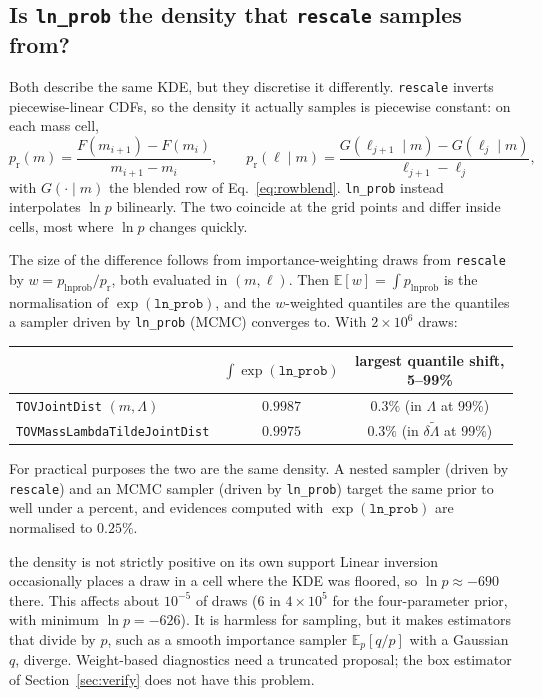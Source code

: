 \documentclass[11pt,a4paper]{article}
\newcommand{\dlt}{\delta\tilde{\Lambda}}
\newcommand{\code}[1]{\texttt{#1}}
\begin{document}
\subsection{Is \code{ln\_prob} the density that \code{rescale} samples from?}
\label{sec:discretisation}

Both describe the same KDE, but they discretise it differently.
\code{rescale} inverts piecewise-linear CDFs, so the density it actually
samples is piecewise constant: on each mass cell,
\begin{equation}
  p_{\mathrm{r}}(m) = \frac{F(m_{i+1}) - F(m_i)}{m_{i+1} - m_i},
  \qquad
  p_{\mathrm{r}}(\ell \mid m) = \frac{G(\ell_{j+1} \mid m) - G(\ell_j \mid m)}{\ell_{j+1} - \ell_j},
  \label{eq:rescale_density}
\end{equation}
with $G(\cdot \mid m)$ the blended row of Eq.~\eqref{eq:rowblend}.
\code{ln\_prob} instead interpolates $\ln p$ bilinearly. The two coincide at the
grid points and differ inside cells, most where $\ln p$ changes quickly.

The size of the difference follows from importance-weighting draws from
\code{rescale} by $w = p_{\mathrm{lnprob}} / p_{\mathrm{r}}$, both
evaluated in $(m, \ell)$. Then $\mathbb{E}[w] = \int p_{\mathrm{lnprob}}$ is the
normalisation of $\exp(\code{ln\_prob})$, and the $w$-weighted quantiles are
the quantiles a sampler driven by \code{ln\_prob} (MCMC) converges to. With
$2\times10^6$ draws:
\begin{center}
\begin{tabular}{lcc}
\toprule
& $\int \exp(\code{ln\_prob})$ & largest quantile shift, 5--99\% \\
\midrule
\code{TOVJointDist} $(m, \Lambda)$ & $0.9987$ & $0.3\%$ (in $\Lambda$ at 99\%) \\
\code{TOVMassLambdaTildeJointDist} & $0.9975$ & $0.3\%$ (in $\dlt$ at 99\%) \\
\bottomrule
\end{tabular}
\end{center}
For practical purposes the two are the same density. A nested sampler (driven
by \code{rescale}) and an MCMC sampler (driven by \code{ln\_prob}) target the
same prior to well under a percent, and evidences computed with
$\exp(\code{ln\_prob})$ are normalised to $0.25\%$.

\begin{caveat}{the density is not strictly positive on its own support}
Linear inversion occasionally places a draw in a cell where the KDE was
floored, so $\ln p \approx -690$ there. This affects about $10^{-5}$ of draws
(6 in $4\times10^5$ for the four-parameter prior, with minimum
$\ln p = -626$). It is harmless for sampling, but it makes estimators that
divide by $p$, such as a smooth importance sampler $\mathbb{E}_p[q/p]$ with a
Gaussian $q$, diverge. Weight-based diagnostics need a truncated proposal; the
box estimator of Section~\ref{sec:verify} does not have this problem.
\end{caveat}
\end{document}
